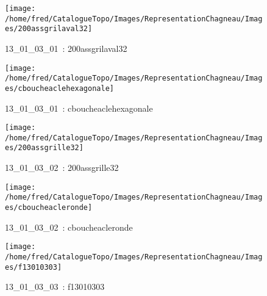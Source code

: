 \documentclass[12pt,titlepage]{book}
\begin{document}
\begin{figure}[h!]
  \hfill         %
  \begin{minipage}[t]{3cm}
    \begin{center}
      \texttt{[image: /home/fred/CatalogueTopo/Images/RepresentationChagneau/Images/200assgrilaval32]}
      \caption[~13\_01\_03\_01]{\small{13\_01\_03\_01~:} \tiny{200assgrilaval32}}\label{200assgrilaval32}
    \end{center}
  \end{minipage}
  \begin{minipage}[t]{3cm}
    \begin{center}
      \texttt{[image: /home/fred/CatalogueTopo/Images/RepresentationChagneau/Images/cboucheaclehexagonale]}
      \caption[~13\_01\_03\_01]{\small{13\_01\_03\_01~:} \tiny{cboucheaclehexagonale}}\label{cboucheaclehexagonale}
    \end{center}
  \end{minipage}
  \begin{minipage}[t]{3cm}
    \begin{center}
      \texttt{[image: /home/fred/CatalogueTopo/Images/RepresentationChagneau/Images/200assgrille32]}
      \caption[~13\_01\_03\_02]{\small{13\_01\_03\_02~:} \tiny{200assgrille32}}\label{200assgrille32}
    \end{center}
  \end{minipage}
  \begin{minipage}[t]{3cm}
    \begin{center}
      \texttt{[image: /home/fred/CatalogueTopo/Images/RepresentationChagneau/Images/cboucheacleronde]}
      \caption[~13\_01\_03\_02]{\small{13\_01\_03\_02~:} \tiny{cboucheacleronde}}\label{cboucheacleronde}
    \end{center}
  \end{minipage}
  \begin{minipage}[t]{3cm}
    \begin{center}
      \texttt{[image: /home/fred/CatalogueTopo/Images/RepresentationChagneau/Images/f13010303]}
      \caption[~13\_01\_03\_03]{\small{13\_01\_03\_03~:} \tiny{f13010303}}\label{f13010303}
    \end{center}
  \end{minipage}

\end{figure}
\end{document}

